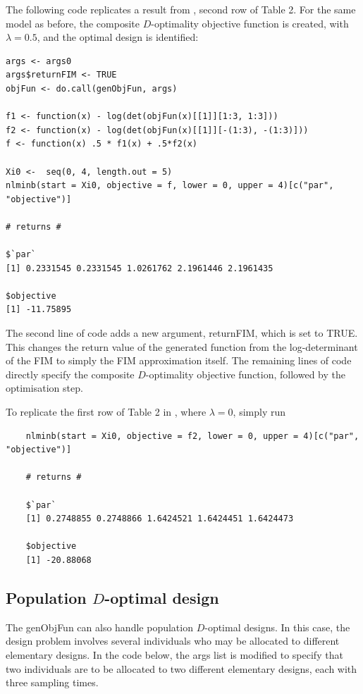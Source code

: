 \documentclass{article}
\theoremstyle{example}
\begin{document}
	
	The following code replicates a result from \cite{Wang2012}, second row of Table 2.
	For the same model as before, the composite $D$-optimality objective function is created, with $\lambda = 0.5$, and the optimal design is identified:
	
	\begin{verbatim}
args <- args0
args$returnFIM <- TRUE
objFun <- do.call(genObjFun, args)

f1 <- function(x) - log(det(objFun(x)[[1]][1:3, 1:3]))
f2 <- function(x) - log(det(objFun(x)[[1]][-(1:3), -(1:3)]))
f <- function(x) .5 * f1(x) + .5*f2(x)

Xi0 <-  seq(0, 4, length.out = 5)
nlminb(start = Xi0, objective = f, lower = 0, upper = 4)[c("par", "objective")]

# returns #

$`par`
[1] 0.2331545 0.2331545 1.0261762 2.1961446 2.1961435

$objective
[1] -11.75895
	\end{verbatim}
	
	The second line of code adds a new argument, \textsf{returnFIM}, which is set to \textsf{TRUE}.
	This changes the return value of the generated function from the log-determinant of the \textsf{FIM} to simply the \textsf{FIM} approximation itself.
	The remaining lines of code directly specify the composite $D$-optimality objective function, followed by the optimisation step.

	To replicate the first row of Table 2 in \cite{Wang2012}, where $\lambda = 0$, simply run
	\begin{verbatim}
	nlminb(start = Xi0, objective = f2, lower = 0, upper = 4)[c("par", "objective")]
	
	# returns #
	
	$`par`
	[1] 0.2748855 0.2748866 1.6424521 1.6424451 1.6424473
	
	$objective
	[1] -20.88068
	\end{verbatim}

\subsection{Population $D$-optimal design}

	The \textsf{genObjFun} can also handle population $D$-optimal designs.
	In this case, the design problem involves several individuals who may be allocated to different elementary designs.
	In the code below, the \textsf{args} list is modified to specify that two individuals are to be allocated to two different elementary designs, each with three sampling times.
	
\end{document}
